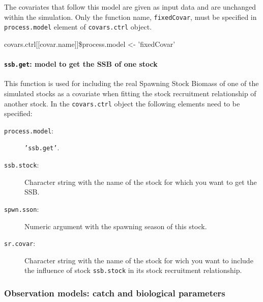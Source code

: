 The covariates that follow this model are given as input data and are unchanged within the simulation.
Only the function name, \texttt{fixedCovar}, must be specified in \texttt{process.model} element of \texttt{covars.ctrl}
object.

\begin{Sinput}
  covars.ctrl[[covar.name]]\$process.model <- 'fixedCovar'
\end{Sinput}

\paragraph{\texttt{ssb.get}: model to get the SSB of one stock} \hspace{0pt} \smallskip

This function is used for including the real Spawning Stock Biomass of one of the simulated stocks as a covariate when fitting the stock recruitment relationship of another stock.
In the \texttt{covars.ctrl} object the following elements need to be specified:
\begin{description}
	\item[\texttt{process.model}:] \texttt{'ssb.get'}.
	\item[\texttt{ssb.stock}:] Character string with the name of the stock for which you want to get the SSB.
	\item[\texttt{spwn.sson}:] Numeric argument with the spawning season of this stock. 
	\item[\texttt{sr.covar}:] Character string with the name of the stock for wich you want to include the influence 
	                          of stock \texttt{ssb.stock} in its stock recruitment relationship.
\end{description}


\subsubsection{Observation models: catch and biological parameters}

